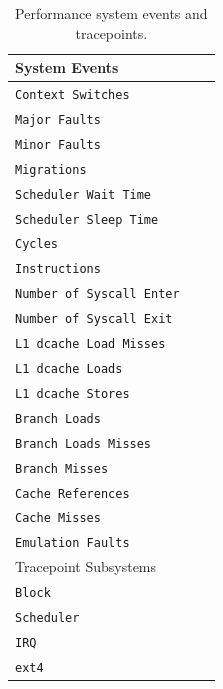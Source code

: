 \begin{table}[]
\centering
\caption{Performance system events and tracepoints. }
\begin{tabular}{lll}
\hline
System Events \\
\hline 
\texttt{Context Switches}\\ 
\texttt{Major Faults}         \\ 
\texttt{Minor Faults }                              \\ 
\texttt{Migrations}                           \\ 
\texttt{Scheduler Wait Time}                             \\ 
\texttt{Scheduler Sleep Time}                             \\ 
\texttt{Cycles}                               \\
\texttt{Instructions}                             \\ 
\texttt{Number of Syscall Enter}                       \\ 
\texttt{Number of Syscall Exit}                       \\ 
\texttt{L1 dcache Load Misses}            \\                   
\texttt{L1 dcache Loads}                               \\
\texttt{L1 dcache Stores}                               \\
\texttt{Branch Loads}                               \\
\texttt{Branch Loads Misses}                            \\
\texttt{Branch Misses}                            \\
\texttt{Cache References}\\
\texttt{Cache Misses}\\
\texttt{Emulation Faults}                               \\
\hline
Tracepoint Subsystems\\
\hline
\texttt{Block}\\
\texttt{Scheduler}\\
\texttt{IRQ}\\
\texttt{ext4}\\
\hline
\end{tabular}
\label{tab:event_conf}
\end{table}


